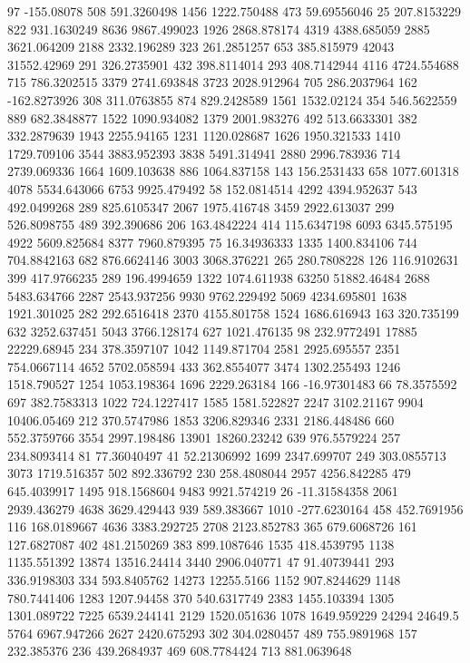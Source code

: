 97	-155.08078
508	591.3260498
1456	1222.750488
473	59.69556046
25	207.8153229
822	931.1630249
8636	9867.499023
1926	2868.878174
4319	4388.685059
2885	3621.064209
2188	2332.196289
323	261.2851257
653	385.815979
42043	31552.42969
291	326.2735901
432	398.8114014
293	408.7142944
4116	4724.554688
715	786.3202515
3379	2741.693848
3723	2028.912964
705	286.2037964
162	-162.8273926
308	311.0763855
874	829.2428589
1561	1532.02124
354	546.5622559
889	682.3848877
1522	1090.934082
1379	2001.983276
492	513.6633301
382	332.2879639
1943	2255.94165
1231	1120.028687
1626	1950.321533
1410	1729.709106
3544	3883.952393
3838	5491.314941
2880	2996.783936
714	2739.069336
1664	1609.103638
886	1064.837158
143	156.2531433
658	1077.601318
4078	5534.643066
6753	9925.479492
58	152.0814514
4292	4394.952637
543	492.0499268
289	825.6105347
2067	1975.416748
3459	2922.613037
299	526.8098755
489	392.390686
206	163.4842224
414	115.6347198
6093	6345.575195
4922	5609.825684
8377	7960.879395
75	16.34936333
1335	1400.834106
744	704.8842163
682	876.6624146
3003	3068.376221
265	280.7808228
126	116.9102631
399	417.9766235
289	196.4994659
1322	1074.611938
63250	51882.46484
2688	5483.634766
2287	2543.937256
9930	9762.229492
5069	4234.695801
1638	1921.301025
282	292.6516418
2370	4155.801758
1524	1686.616943
163	320.735199
632	3252.637451
5043	3766.128174
627	1021.476135
98	232.9772491
17885	22229.68945
234	378.3597107
1042	1149.871704
2581	2925.695557
2351	754.0667114
4652	5702.058594
433	362.8554077
3474	1302.255493
1246	1518.790527
1254	1053.198364
1696	2229.263184
166	-16.97301483
66	78.3575592
697	382.7583313
1022	724.1227417
1585	1581.522827
2247	3102.21167
9904	10406.05469
212	370.5747986
1853	3206.829346
2331	2186.448486
660	552.3759766
3554	2997.198486
13901	18260.23242
639	976.5579224
257	234.8093414
81	77.36040497
41	52.21306992
1699	2347.699707
249	303.0855713
3073	1719.516357
502	892.336792
230	258.4808044
2957	4256.842285
479	645.4039917
1495	918.1568604
9483	9921.574219
26	-11.31584358
2061	2939.436279
4638	3629.429443
939	589.383667
1010	-277.6230164
458	452.7691956
116	168.0189667
4636	3383.292725
2708	2123.852783
365	679.6068726
161	127.6827087
402	481.2150269
383	899.1087646
1535	418.4539795
1138	1135.551392
13874	13516.24414
3440	2906.040771
47	91.40739441
293	336.9198303
334	593.8405762
14273	12255.5166
1152	907.8244629
1148	780.7441406
1283	1207.94458
370	540.6317749
2383	1455.103394
1305	1301.089722
7225	6539.244141
2129	1520.051636
1078	1649.959229
24294	24649.5
5764	6967.947266
2627	2420.675293
302	304.0280457
489	755.9891968
157	232.385376
236	439.2684937
469	608.7784424
713	881.0639648
